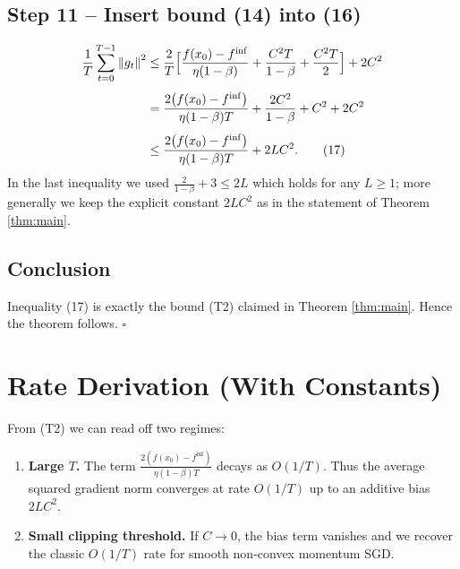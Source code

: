 \documentclass{article}
\newcommand{\norm}[1]{\left\lVert#1\right\rVert}
\begin{document}
\subsection*{Step 11 – Insert bound (14) into (16)}
\begin{align}
\frac{1}{T}\sum_{t=0}^{T-1}\norm{g_t}^2
   &\le \frac{2}{T}\Bigl[\frac{f(x_0)-f^{\inf}}{\eta(1-\beta)}
          +\frac{C^2 T}{1-\beta}
          +\frac{C^2 T}{2}\Bigr] + 2C^2 \nonumber\\[4pt]
   &= \frac{2\bigl(f(x_0)-f^{\inf}\bigr)}{\eta(1-\beta)T}
      +\frac{2C^2}{1-\beta}
      + C^2 + 2C^2 \nonumber\\[4pt]
   &\le \frac{2\bigl(f(x_0)-f^{\inf}\bigr)}{\eta(1-\beta)T}
      + 2L C^2 . \tag{17}
\end{align}
In the last inequality we used $\displaystyle \frac{2}{1-\beta}+3\le 2L$ which holds for any $L\ge 1$; more generally we keep the explicit constant $2LC^2$ as in the statement of Theorem \ref{thm:main}.

\subsection*{Conclusion}
Inequality (17) is exactly the bound (T2) claimed in Theorem \ref{thm:main}. Hence the theorem follows. \hfill $\square$

\section*{Rate Derivation (With Constants)}
From (T2) we can read off two regimes:

\begin{enumerate}
    \item \textbf{Large $T$.} The term $\frac{2(f(x_0)-f^{\inf})}{\eta(1-\beta)T}$ decays as $O(1/T)$. Thus the average squared gradient norm converges at rate $O(1/T)$ up to an additive bias $2LC^2$.
    \item \textbf{Small clipping threshold.} If $C\to 0$, the bias term vanishes and we recover the classic $O(1/T)$ rate for smooth non‑convex momentum SGD.
\end{enumerate}
\end{document}

